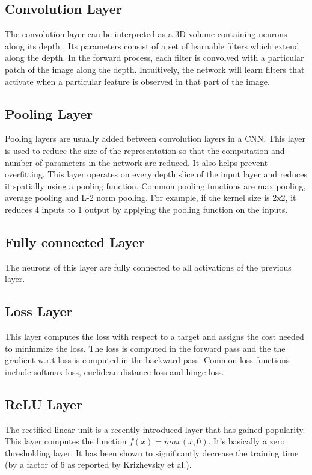\documentclass[10pt,twocolumn,letterpaper]{article}
\begin{document}
\subsection{Convolution Layer}
The convolution layer can be interpreted as a 3D volume containing neurons along its depth \cite{cnnref}. Its parameters consist of a set of learnable filters which extend along the depth. In the forward process, each filter is convolved with a particular patch of the image along the depth. Intuitively, the network will learn filters that activate when a particular feature is observed in that part of the image.

\subsection{Pooling Layer}
Pooling layers are usually added between convolution layers in a CNN. This layer is used to reduce the size of the representation so that the computation and number of parameters in the network are reduced. It also helps prevent overfitting. This layer operates on every depth slice of the input layer and reduces it spatially using a pooling function. Common pooling functions are max  pooling, average pooling and L-2 norm pooling. For example, if the kernel size is 2x2, it reduces 4 inputs to 1 output by applying the pooling function on the inputs.

\subsection{Fully connected Layer}
The neurons of this layer are fully connected to all activations of the previous layer.

\subsection{Loss Layer}
This layer computes the loss with respect to a target and assigns the cost needed to mininmize the loss. The loss is computed in the forward pass and the the gradient w.r.t loss is computed in the backward pass. Common loss functions include softmax loss, euclidean distance loss and hinge loss.

\subsection{ReLU Layer}
The rectified linear unit is a recently introduced layer that has gained popularity. This layer computes the function $f(x) = max(x,0)$. It's basically a zero thresholding layer. It has been shown to significantly decrease the training time (by a factor of 6 as reported by Krizhevsky et al.).
\end{document}
